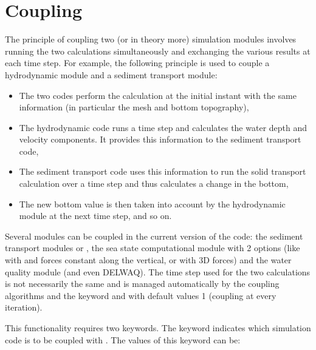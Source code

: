 \section{Coupling}
\label{sec:coupling}

The principle of coupling two (or in theory more) simulation modules involves
running the two calculations simultaneously and exchanging the various results
at each time step. For example, the following principle is used to couple a
hydrodynamic module and a sediment transport module:

\begin{itemize}
\item  The two codes perform the calculation at the initial instant with the
same information (in particular the mesh and bottom topography),

\item  The hydrodynamic code runs a time step and calculates the water depth
and velocity components. It provides this information to the sediment transport
code,

\item  The sediment transport code uses this information to run the solid
transport calculation over a time step and thus calculates a change in the
bottom,

\item  The new bottom value is then taken into account by the hydrodynamic
module at the next time step, and so on.
\end{itemize}

Several modules can be coupled in the current version of the code:
the sediment transport modules \gaia or \sisyphe,
the sea state computational module \tomawac with 2 options (like with
 and forces constant along the vertical, or with 3D forces)
and the water quality module \waqtel (and even DELWAQ). The
time step used for the two calculations is not necessarily the same and is
managed automatically by the coupling algorithms and the keyword
 and 
with default values 1 (coupling at every iteration).

This functionality requires two keywords. The keyword 
indicates which simulation code is to be coupled with . The values of
this keyword can be:

